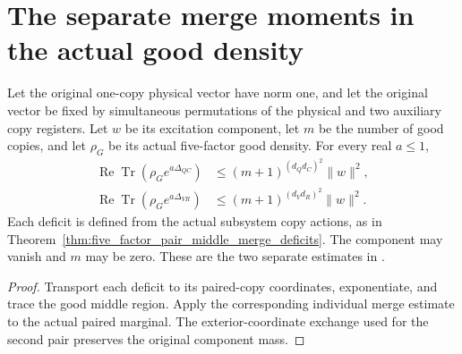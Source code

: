 \section{The separate merge moments in the actual good density}
\label{sec:replica_good_configuration_individual_merge_moment}

\begin{theorem}
\label{thm:replica_good_configuration_individual_merge_moments}
\leanok
Let the original one-copy physical vector have norm one, and let the
original vector be fixed by simultaneous permutations of the physical
and two auxiliary copy registers. Let $w$ be its excitation component,
let $m$ be the number of good copies, and let $\rho_G$ be its actual
five-factor good density. For every real $a\leq1$,
\begin{align}
 \operatorname{Re}\operatorname{Tr}(\rho_Ge^{a\Delta_{QC}})
 &\leq (m+1)^{(d_Qd_C)^2}\|w\|^2,\\
 \operatorname{Re}\operatorname{Tr}(\rho_Ge^{a\Delta_{VR}})
 &\leq (m+1)^{(d_Vd_R)^2}\|w\|^2.
\end{align}
Each deficit is defined from the actual subsystem copy actions, as in
Theorem~\ref{thm:five_factor_pair_middle_merge_deficits}. The component
may vanish and $m$ may be zero. These are the two separate estimates in
\cite[Section~8]{OpenAI2026AreaLaw}.
\end{theorem}
\begin{proof}\leanok
{}
Transport each deficit to its paired-copy coordinates, exponentiate,
and trace the good middle region. Apply the corresponding individual
merge estimate to the actual paired marginal. The exterior-coordinate
exchange used for the second pair preserves the original component mass.
\end{proof}
